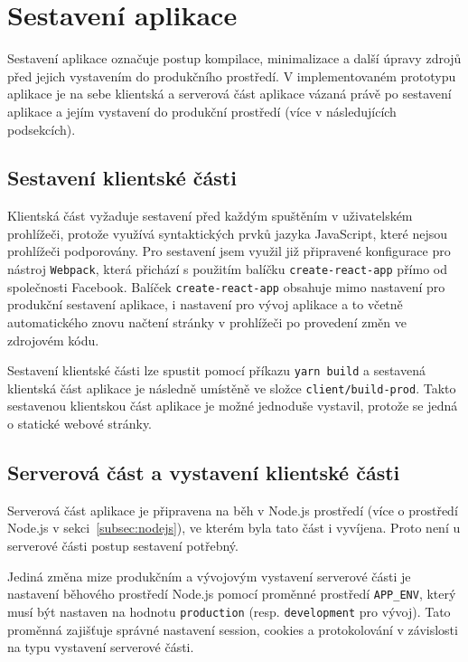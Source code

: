 
\section{Sestavení aplikace}\label{sec:sestaveníAplikace}

Sestavení aplikace označuje postup kompilace, minimalizace a další úpravy zdrojů před jejich vystavením do produkčního prostředí.
V implementovaném prototypu aplikace je na sebe klientská a serverová část aplikace vázaná právě po sestavení aplikace a jejím vystavení do produkční prostředí (více v následujících podsekcích).

\subsection{Sestavení klientské části}\label{subsec:sestaveníKlientskéČásti}

Klientská část vyžaduje sestavení před každým spuštěním v uživatelském prohlížeči, protože využívá syntaktických prvků jazyka JavaScript, které nejsou prohlížeči podporovány.
Pro sestavení jsem využil již připravené konfigurace pro nástroj \texttt{Webpack}, která přichází s použitím balíčku \texttt{create-react-app} přímo od společnosti Facebook.
Balíček \texttt{create-react-app} obsahuje mimo nastavení pro produkční sestavení aplikace, i nastavení pro vývoj aplikace a to včetně automatického znovu načtení stránky v prohlížeči po provedení změn ve zdrojovém kódu.

Sestavení klientské části lze spustit pomocí příkazu \texttt{yarn build} a sestavená klientská část aplikace je následně umístěně ve složce \texttt{client/build-prod}.
Takto sestavenou klientskou část aplikace je možné jednoduše vystavil, protože se jedná o statické webové stránky.

\subsection{Serverová část a vystavení klientské části}\label{subsec:serverováČástAVystaveníKlientskéČásti}

Serverová část aplikace je připravena na běh v Node.js prostředí (více o prostředí Node.js v sekci~\ref{subsec:nodejs}), ve kterém byla tato část i vyvíjena.
Proto není u serverové části postup sestavení potřebný.

Jediná změna mize produkčním a vývojovým vystavení serverové části je nastavení běhového prostředí Node.js pomocí proměnné prostředí \texttt{APP\_ENV}, který musí být nastaven na hodnotu \texttt{production} (resp. \texttt{development} pro vývoj).
Tato proměnná zajišťuje správné nastavení session, cookies a protokolování v závislosti na typu vystavení serverové části.

